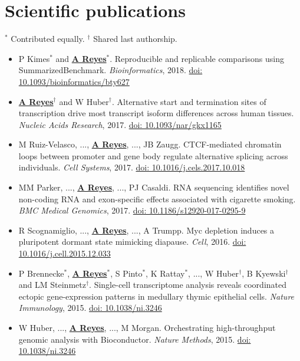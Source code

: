 \documentclass[11pt,a4paper,sans]{moderncv} %
\begin{document}
\section{Scientific publications}
\vspace{-.1cm}
\footnotesize{$^{\ast}$ Contributed equally.} \hspace{.5cm}
\footnotesize{$^{\dagger}$ Shared last authorship.}
\vspace{.1cm}
\begin{itemize}
\item P Kimes$^{\ast}$ and \textbf{\underline{A Reyes}}$^{\ast}$. Reproducible and replicable comparisons using SummarizedBenchmark. \textit{Bioinformatics}, 2018. \href{https://doi.org/10.1093/bioinformatics/bty627}{doi: 10.1093/bioinformatics/bty627}
\item \textbf{\underline{A Reyes}}$^{\dagger}$ and W Huber$^{\dagger}$. Alternative start and termination sites of transcription drive most transcript isoform differences across human tissues. \textit{Nucleic Acids Research}, 2017. \href{https://doi.org/10.1093/nar/gkx1165}{doi: 10.1093/nar/gkx1165}
\item M Ruiz-Velasco, ..., \textbf{\underline{A Reyes}}, ..., JB Zaugg. CTCF-mediated chromatin loops between promoter and gene body regulate alternative splicing across individuals. \textit{Cell Systems}, 2017. \href{http://dx.doi.org/10.1016/j.cels.2017.10.018}{doi: 10.1016/j.cels.2017.10.018}
\item MM Parker, ..., \textbf{\underline{A Reyes}}, ..., PJ Casaldi. RNA sequencing identifies novel non-coding RNA and exon-specific effects associated with cigarette smoking. \textit{BMC Medical Genomics}, 2017. \href{https://doi.org/10.1186/s12920-017-0295-9}{doi: 10.1186/s12920-017-0295-9}
\item R Scognamiglio, ..., \textbf{\underline{A Reyes}}, ..., A Trumpp. Myc depletion induces a pluripotent dormant state mimicking diapause. \textit{Cell}, 2016. \href{https://doi.org/10.1016/j.cell.2015.12.033}{doi: 10.1016/j.cell.2015.12.033}
\item P Brennecke$^{\ast}$, \textbf{\underline{A Reyes}}$^{\ast}$, S Pinto$^{\ast}$, K Rattay$^{\ast}$, ..., W Huber$^{\dagger}$, B Kyewski$^{\dagger}$ and LM Steinmetz$^{\dagger}$. Single-cell transcriptome analysis reveals coordinated ectopic gene-expression patterns in medullary thymic epithelial cells. \textit{Nature Immunology}, 2015. \href{https://doi.org/10.1038/ni.3246}{doi: 10.1038/ni.3246}
\item W Huber, ..., \textbf{\underline{A Reyes}}, ..., M Morgan. Orchestrating high-throughput genomic analysis with Bioconductor. \textit{Nature Methods}, 2015. \href{https://doi.org/10.1038/ni.3246}{doi: 10.1038/ni.3246}

\end{itemize}
\end{document}
